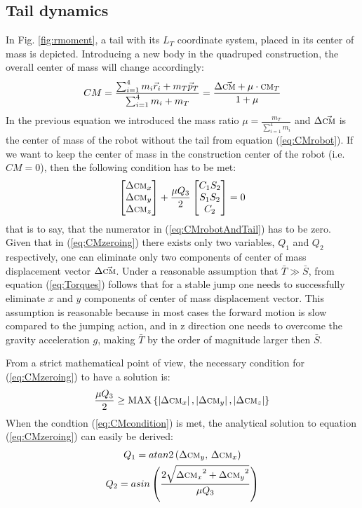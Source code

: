 \subsection{Tail dynamics}
In Fig. \ref{fig:rmoment}, a tail with its ${L_T}$ coordinate system, placed in its center of mass is depicted. Introducing a new body in the quadruped construction, the overall center of mass will change accordingly:
\begin{equation}\label{eq:CMrobotAndTail}
CM=\frac{\sum_{i=1}^{4}m_i\vec{r}_i+m_T\vec{p}_T}{\sum_{i=1}^{4}m_i+m_T}= \frac{\Delta\vec{\textsc{cm}}+\mu\cdot\textsc{cm}_T}{1+\mu}
\end{equation}
In the previous equation we introduced the mass ratio $\mu=\frac{m_T}{\sum_{i=1}^{4}m_i}$ and $\Delta\vec{\textsc{cm}}$ is the center of mass of the robot without the tail from equation (\ref{eq:CMrobot}). If we want to keep the center of mass in the construction center of the robot (i.e. $CM=0$), then the following condition has to be met:
\begin{equation}\label{eq:CMzeroing}
\begin{bmatrix}
\Delta \textsc{cm}_x\\ 
\Delta \textsc{cm}_y\\ 
\Delta \textsc{cm}_z
\end{bmatrix}+
\frac{\mu Q_3}{2}\begin{bmatrix}
C_1S_2\\ 
S_1S_2\\ 
C_2
\end{bmatrix}=0
\end{equation}
that is to say, that the numerator in (\ref{eq:CMrobotAndTail}) has to be zero. Given that in (\ref{eq:CMzeroing}) there exists only two variables, $Q_1$ and $Q_2$ respectively, one can eliminate only two components of center of mass displacement vector $\Delta \vec{\textsc{cm}}$. Under a reasonable assumption that $\bar{T}\gg \bar{S}$, from equation (\ref{eq:Torques}) follows that for a stable jump one needs to successfully eliminate $x$ and $y$ components of center of mass displacement vector. This assumption is reasonable because in most cases the forward motion is slow compared to the jumping action, and in z direction one needs to overcome the gravity acceleration $g$, making $\bar{T}$ by the order of magnitude larger then $\bar{S}$.

From a strict mathematical point of view, the necessary condition for (\ref{eq:CMzeroing}) to have a solution is:
\begin{equation}\label{eq:CMcondition}
\frac{\mu Q_3}{2}\geq \textup{MAX}\left \{ \left | \Delta \textsc{cm}_x \right |, \left | \Delta \textsc{cm}_y \right |,\left | \Delta \textsc{cm}_z \right |\right \}
\end{equation}
When the condtion (\ref{eq:CMcondition}) is met, the analytical solution to equation (\ref{eq:CMzeroing}) can easily be derived:
\begin{gather}\label{eq:CMsolution}
Q_1=atan2\left({\Delta \textsc{cm}_y},\, {\Delta \textsc{cm}_x}\right)\\
Q_2=asin\left(\frac{2\sqrt{{\Delta \textsc{cm}_x}^2+{\Delta \textsc{cm}_y}^2}}{\mu Q_3} \right)
\end{gather}

